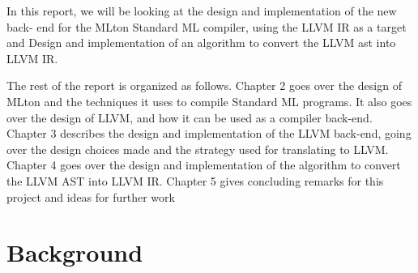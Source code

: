 \documentclass{book}
\begin{document}
In this report, we will be looking at the design and implementation of the new back-
end for the MLton Standard ML compiler, using the LLVM IR as a target and Design and implementation of an algorithm to convert the LLVM ast into LLVM IR.

The rest of the report is organized as follows. Chapter 2 goes over the design of MLton
and the techniques it uses to compile Standard ML programs.  It also goes over the design
of LLVM, and how it can be used as a compiler back-end.  Chapter 3 describes the design
and implementation of the LLVM back-end, going over the design choices made and the
strategy used for translating to LLVM. Chapter 4 goes over the design and implementation of the algorithm to convert the LLVM AST into LLVM IR. Chapter 5 gives concluding remarks for this project and ideas for further work

\chapter{Background}
\end{document}
